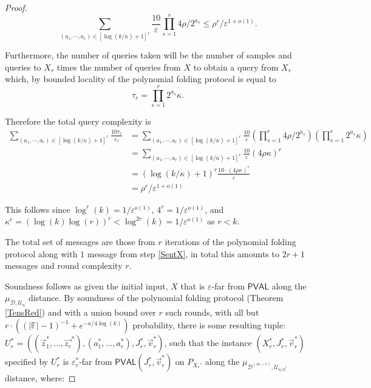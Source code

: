 \documentclass[10pt,a4paper]{article}
\newcommand{\PVAL}{\mathsf{PVAL}}
\begin{document}
\begin{proof}
\begin{equation*}
    \sum_{(a_{1},\cdots, a_{r})\in[\log(k/\kappa)+1]^{r}}\frac{10}{\varepsilon}\prod_{s=1}^{r}4\rho/2^{a_{s}} \leq \rho^{r}/\varepsilon^{1+o(1)}.
\end{equation*}

Furthermore, the number of queries taken will be the number of samples and queries to $X_{r}$ times the number of queries from $X$ to obtain a query from $X_{r}$ which, by bounded locality of the polynomial folding protocol is equal to 
\begin{equation*}
    \tau_{r}=\prod_{s=1}^{r}2^{a_{s}}\kappa.
\end{equation*}

Therefore the total query complexity is
\[
\begin{split}
    \sum_{(a_{1},\cdots, a_{r})\in [\log(k/\kappa)+1]^{r}}\frac{10\tau_{r}}{\varepsilon_{r}} &=\sum_{(a_{1},\cdots, a_{r})\in [\log(k/\kappa)+1]^{r}}\frac{10}{\varepsilon}\left(\prod_{s=1}^{r}4\rho/2^{a_{s}}\right)\left(\prod_{s=1}^{r}2^{a_{s}}\kappa\right)\\
    &=\sum_{(a_{1},\cdots, a_{r})\in [\log(k/\kappa)+1]^{r}}\frac{10}{\varepsilon}\left(4\rho\kappa\right)^{r}\\
    &=(\log (k/\kappa) +1)^{r}\frac{10\cdot (4\rho\kappa)^{r}}{\varepsilon}\\
    &=\rho^{r}/\varepsilon^{1+o(1)}
\end{split}
\]

This follows since $\log^{r}(k)=1/\varepsilon^{o(1)}$, $4^{r}=1/\varepsilon^{o(1)}$, and $\kappa^{r}=(\log (k)\log (r))^{r}<\log ^{2r}(k)=1/\varepsilon^{o(1)}$ as $r<k$.


The total set of messages are those from $r$ iterations of the polynomial folding protocol along with $1$ message from step \ref{SentX}, in total this amounts to $2r+1$ messages and round complexity $r$.

Soundness follows as given the initial input, $X$ that is $\varepsilon$-far from $\PVAL$ along the $\mu_{\mathcal{D},\mathcal{U}_{n}}$ distance. By soundness of the polynomial folding protocol (Theorem \ref{TensRed}) and with a union bound over $r$ such rounds, with all but $r\cdot((\vert \mathbb{F}\vert -1)^{-1}+e^{-\kappa/4\log (k)})$ probability, there is some resulting tuple: $U_{r}^{\ast}=((\vec{z}_{1}^{\ast}, . . . , \vec{z_{r}}^{\ast}),(a_{1}^{\ast}, . . . , a_{r}^{\ast}), J_{r}^{\ast}, \vec{v}_{r}^{\ast})$, such that the instance $(X_{r}^{\ast}, J_{r}^{\ast}, \vec{v}_{r}^{\ast})$ specified by $U_{r}^{\ast}$ is $\varepsilon_{r}^{\ast}$-far from $\PVAL(J_{r}^{\ast},\Vec{v}_{r}^{\ast})$ on $P_{X_{r}'}$ along the $\mu_{\mathcal{D}^{(m-r)},\mathcal{U}_{n/k^{r}}}$ distance, where:


\end{proof}
\end{document}
